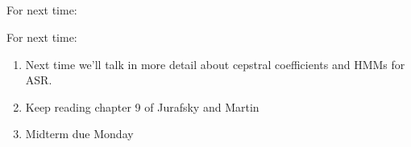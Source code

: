 \documentclass[9pt,xcolor=pdftex,dvipsnames,table]{beamer}
\begin{document}
\subsection{}
\begin{frame}{For next time:}
     \begin{block}{For next time:}
          \begin{enumerate}
     	  \item Next time we'll talk in more detail about cepstral coefficients and HMMs for ASR.
     	  \item Keep reading chapter 9 of Jurafsky and Martin
     	  \item Midterm due Monday
          \end{enumerate}
     \end{block}
\end{frame}
\end{document}

